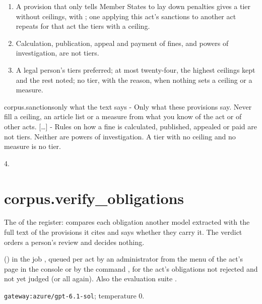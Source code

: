 \begin{enumerate}[itemsep=1pt, topsep=3pt]
    penalty is no ceiling of a fine --- the measure is given, the ceilings stay empty.
  \item A provision that only tells Member States to lay down penalties gives a tier without
    ceilings, with ; one applying this act's sanctions to another act repeats for
    that act the tiers with a ceiling.
  \item Calculation, publication, appeal and payment of fines, and powers of investigation,
    are not tiers.
  \item A legal person's tiers preferred; at most twenty-four, the highest ceilings kept and the
    rest noted; no tier, with the reason, when nothing sets a ceiling or a measure.
\end{enumerate}

\par\nopagebreak
\begin{promptexcerpt}{corpus.sanctions}{only what the text says}
- Only what these provisions say. Never fill a ceiling, an article list or a measure from what you know of the act or of other acts.
[…]
- Rules on how a fine is calculated, published, appealed or paid are not tiers. Neither are powers of investigation. A tier with no ceiling and no measure is no tier.
\end{promptexcerpt}

 4.


\section{corpus.verify\_obligations}\label{sec:aprompts:corpus-verify_obligations}

 The  of the register: compares each obligation another
model extracted with the full text of the provisions it cites and says whether they carry it.
The verdict orders a person's review and decides nothing.

  () in the job
, queued per act by an administrator from the menu of the
act's page in the console or by the command , for the act's obligations not rejected and not yet
judged (or all again). Also the evaluation suite .

 \texttt{gateway:azure/gpt-6.1-sol}; temperature 0.


